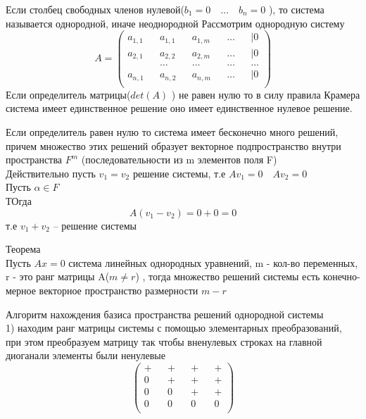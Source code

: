 \documentclass[a4paper, 12pt]{article}
\begin{document}
Если столбец свободных членов нулевой($ b_1 = 0 \quad \ldots \quad b_n = 0 $ ), то система называется однородной, иначе неоднородной
Рассмотрим однородную систему 
\[
	A = \begin{pmatrix}
		a_{1,1} && a_{1,1} && a_{1,m} && \ldots &&| 0\\
		a_{2,1} && a_{2,2} && a_{2,m}&& \ldots &&| 0\\
		&& \ldots && \ldots && \ldots && \ldots\\
		a_{n,1} && a_{n,2} && a_{n,m}&& \ldots &&| 0\\
	\end{pmatrix}
\]
Если определитель матрицы($ det(A) $ ) не равен нулю то в силу правила Крамера система имеет единственное решение оно имеет единственное нулевое решение.

Если определитель равен нулю то система имеет бесконечно много решений, причем множество этих решений образует векторное подпространство внутри пространства $ F^m $ (последовательности из m элементов поля F)\\ 

Действительно пусть $ v_1 = v_2 $ решение системы, т.е $ Av_1 = 0 \quad Av_2 = 0 $\\
Пусть $ \alpha  \in F $\\
ТОгда \[
	A(v_1 - v_2) = 0 + 0 = 0
\]   
т.е $ v_1 + v_2  $ -- решение системы 
\newpage
\begin{mdframed}[backgroundcolor=blue!20] 
       Теорема\\
       Пусть $ Ax = 0 $ система линейных однородных уравнений, m - кол-во переменных, r - это ранг матрицы A($ m \neq r $) , тогда множество решений системы есть конечно-мерное векторное пространство размерности $ m-r $  
    \end{mdframed}
Алгоритм нахождения базиса пространства решений однородной системы\\
1) находим ранг матрицы системы с помощью элементарных преобразований, при этом преобразуем матрицу так чтобы вненулевых строках на главной диоганали элементы были ненулевые
\[
	\begin{pmatrix}
		+ && + && + && + \\
		0 && + && + && + \\
		0 && 0 && + && + \\
		0 && 0 && 0 && 0 \\
	\end{pmatrix}
\]
\end{document}

